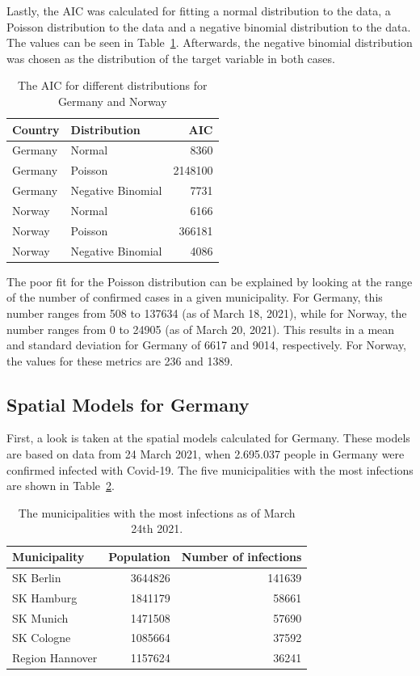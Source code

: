 Lastly, the AIC was calculated for fitting a normal distribution to the data, a Poisson distribution to the data and a negative binomial distribution to the data. The values can be seen in Table~\ref{aic}. Afterwards, the negative binomial distribution was chosen as the distribution of the target variable in both cases. \\
\begin{table}[H] 
\caption{The AIC for different distributions for Germany and Norway \label{aic}}
\begin{tabular}{l l r}
\toprule
\textbf{Country}	& \textbf{Distribution}	& \textbf{AIC} \\
\midrule
Germany & Normal & 8360 \\
Germany & Poisson & 2148100 \\
Germany & Negative Binomial & 7731 \\
Norway & Normal & 6166 \\
Norway & Poisson & 366181 \\
Norway & Negative Binomial & 4086 \\
\bottomrule
\end{tabular}
\end{table} 
The poor fit for the Poisson distribution can be explained by looking at the range of the number of confirmed cases in a given municipality. For Germany, this number ranges from 508 to 137634 (as of March 18, 2021), while for Norway, the number ranges from 0 to 24905 (as of March 20, 2021). This results in a mean and standard deviation for Germany of 6617 and 9014, respectively. For Norway, the values for these metrics are 236 and 1389.
\subsection{Spatial Models for Germany}
First, a look is taken at the spatial models calculated for Germany. These models are based on data from 24 March 2021, when 2.695.037 people in Germany were confirmed infected with Covid-19. The five municipalities with the most infections are shown in Table~\ref{top5germany}.
\begin{table}[H] 
\caption{The municipalities with the most infections as of March 24th 2021. \label{top5germany}}
\begin{tabular}{l r r}
\toprule
\textbf{Municipality}	& \textbf{Population}	& \textbf{Number of infections} \\
\midrule
SK Berlin & 3644826 & 141639   \\     
SK Hamburg & 1841179 & 58661   \\
SK Munich & 1471508 & 57690   \\
SK Cologne & 1085664 & 37592   \\
Region Hannover & 1157624 & 36241   \\
\bottomrule
\end{tabular}
\end{table}
